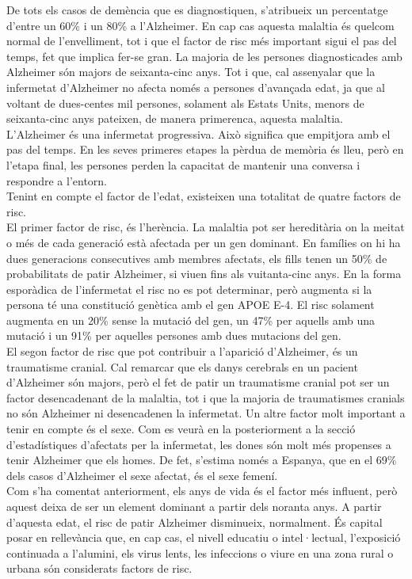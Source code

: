 \documentclass[a4paper,12pt]{report}
\begin{document}
De tots els casos de demència que es diagnostiquen, s'atribueix un percentatge d'entre un 60\% i un 80\% a l'Alzheimer. En cap cas aquesta malaltia és quelcom normal de l'envelliment, tot i que el factor de risc més important sigui el pas del temps, fet que implica fer-se gran. La majoria de les persones diagnosticades amb Alzheimer són majors de seixanta-cinc anys. Tot i que, cal assenyalar que la infermetat d'Alzheimer no afecta només a persones d'avançada edat, ja que al voltant de dues-centes mil persones, solament als Estats Units, menors de seixanta-cinc anys pateixen, de manera primerenca, aquesta malaltia.\\
L'Alzheimer és una infermetat progressiva. Això significa que empitjora amb el pas del temps. En les seves primeres etapes la pèrdua de memòria és lleu, però en l'etapa final, les persones perden la capacitat de mantenir una conversa i respondre a l'entorn.\\
Tenint en compte el factor de l'edat, existeixen una totalitat de quatre factors de risc.\\
El primer factor de risc, és l'herència. La malaltia pot ser hereditària on la meitat o més de cada generació està afectada per un gen dominant. En famílies on hi ha dues generacions consecutives amb membres afectats, els fills tenen un 50\% de probabilitats de patir Alzheimer, si viuen fins als vuitanta-cinc anys. En la forma esporàdica de l'infermetat el risc no es pot determinar, però augmenta si la persona té una constitució genètica amb el gen APOE E-4. El risc solament augmenta en un 20\% sense la mutació del gen, un 47\% per aquells amb una mutació i un 91\% per aquelles persones amb dues mutacions del gen.\\
El segon factor de risc que pot contribuir a l'aparició d'Alzheimer, és un traumatisme cranial. Cal remarcar que els danys cerebrals en un pacient d'Alzheimer són majors, però el fet de patir un traumatisme cranial pot ser un factor desencadenant de la malaltia, tot i que la majoria de traumatismes cranials no són Alzheimer ni desencadenen la infermetat.
Un altre factor molt important a tenir en compte és el sexe. Com es veurà en la posteriorment a la secció d'estadístiques d'afectats per la infermetat, les dones són molt més propenses a tenir Alzheimer que els homes. De fet, s'estima només a Espanya, que en el 69\% dels casos d'Alzheimer el sexe afectat, és el sexe femení.\\
Com s'ha comentat anteriorment, els anys de vida és el factor més influent, però aquest deixa de ser un element dominant a partir dels noranta anys. A partir d'aquesta edat, el risc de patir Alzheimer disminueix, normalment. És capital posar en rellevància que, en cap cas, el nivell educatiu o intel·lectual, l'exposició continuada a l'alumini, els virus lents, les infeccions o viure en una zona rural o urbana són considerats factors de risc.
\end{document}
